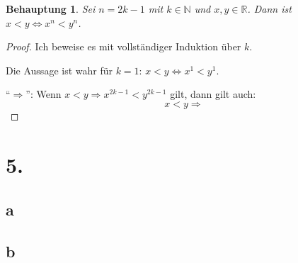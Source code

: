 \documentclass[a4paper,10pt]{article}
\newtheorem*{claim}{Behauptung}
\begin{document}
\begin{claim}
 Sei $n = 2k - 1$ mit $k \in \mathbb{N}$ und $x, y \in \mathbb{R}$.
 Dann ist $x < y \Leftrightarrow x^n < y^n$.
\end{claim}

\begin{proof}
 Ich beweise es mit vollständiger Induktion über $k$.
 
 Die Aussage ist wahr für $k = 1$: $x < y \Leftrightarrow x^1 < y^1$.
 
 ``$\Rightarrow$'': Wenn $x < y \Rightarrow x^{2k - 1} < y^{2k - 1}$ gilt, dann gilt auch:
 \begin{equation*}
  x < y \Rightarrow 
 \end{equation*}
\end{proof}

\section*{5.}

\subsection*{a}

\subsection*{b}
\end{document}
